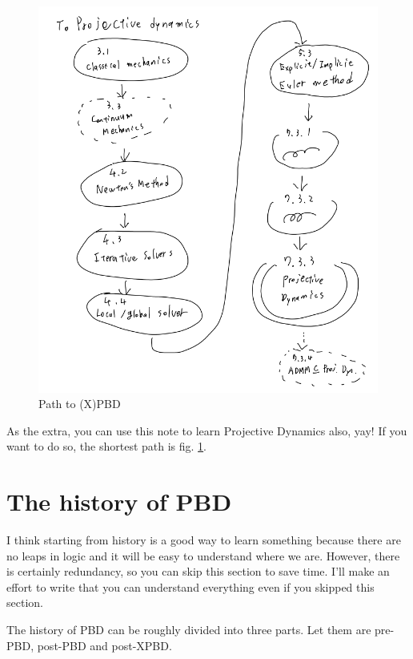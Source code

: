 \documentclass[pdflatex,sn-mathphys-num]{sn-jnl}%
\theoremstyle{thmstyleone}%
\theoremstyle{thmstyletwo}%
\theoremstyle{thmstylethree}%
\begin{document}
\begin{figure}[h]
\begin{minipage}[b]{0.49\columnwidth}
\includegraphics[width=1.1\textwidth]{images/ProjDyn_path.png}
\caption{Path to (X)PBD}
\label{ProjPath}
	\end{minipage}
\end{figure}

As the extra, you can use this note to learn Projective Dynamics also, yay!
If you want to do so, the shortest path is fig. \ref{ProjPath}.

\section{The history of PBD}
I think starting from history is a good way to learn something because there are no leaps in logic and it will be easy to understand where we are. However, there is certainly redundancy, so you can skip this section to save time. I'll make an effort to write that you can understand everything even if you skipped this section.

The history of PBD can be roughly divided into three parts.
Let them are pre-PBD, post-PBD and post-XPBD.
\end{document}

